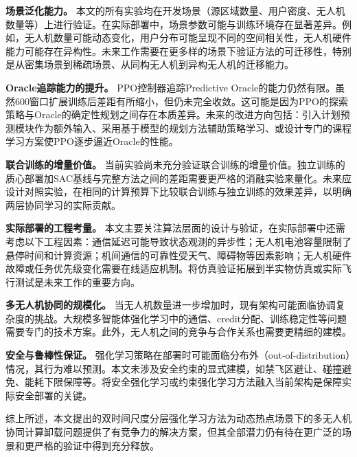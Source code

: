 \textbf{场景泛化能力。} 本文的所有实验均在开发场景（源区域数量、用户密度、无人机数量等）上进行验证。在实际部署中，场景参数可能与训练环境存在显著差异。例如，无人机数量可能动态变化，用户分布可能呈现不同的空间相关性，无人机硬件能力可能存在异构性。未来工作需要在更多样的场景下验证方法的可迁移性，特别是从密集场景到稀疏场景、从同构无人机到异构无人机的迁移能力。

\textbf{Oracle追踪能力的提升。} PPO控制器追踪Predictive Oracle的能力仍然有限。虽然600窗口扩展训练后差距有所缩小，但仍未完全收敛。这可能是因为PPO的探索策略与Oracle的确定性规划之间存在本质差异。未来的改进方向包括：引入计划预测模块作为额外输入、采用基于模型的规划方法辅助策略学习、或设计专门的课程学习方案使PPO逐步逼近Oracle的性能。

\textbf{联合训练的增量价值。} 当前实验尚未充分验证联合训练的增量价值。独立训练的质心部署加SAC基线与完整方法之间的差距需要更严格的消融实验来量化。未来应设计对照实验，在相同的计算预算下比较联合训练与独立训练的效果差异，以明确两层协同学习的实际贡献。

\textbf{实际部署的工程考量。} 本文主要关注算法层面的设计与验证，在实际部署中还需考虑以下工程因素：通信延迟可能导致状态观测的异步性；无人机电池容量限制了悬停时间和计算资源；机间通信的可靠性受天气、障碍物等因素影响；无人机硬件故障或任务优先级变化需要在线适应机制。将仿真验证拓展到半实物仿真或实际飞行测试是未来工作的重要方向。

\textbf{多无人机协同的规模化。} 当无人机数量进一步增加时，现有架构可能面临协调复杂度的挑战。大规模多智能体强化学习中的通信、credit分配、训练稳定性等问题需要专门的技术方案。此外，无人机之间的竞争与合作关系也需要更精细的建模。

\textbf{安全与鲁棒性保证。} 强化学习策略在部署时可能面临分布外（out-of-distribution）情况，其行为难以预测。本文未涉及安全约束的显式建模，如禁飞区避让、碰撞避免、能耗下限保障等。将安全强化学习或约束强化学习方法融入当前架构是保障实际安全部署的关键。

综上所述，本文提出的双时间尺度分层强化学习方法为动态热点场景下的多无人机协同计算卸载问题提供了有竞争力的解决方案，但其全部潜力仍有待在更广泛的场景和更严格的验证中得到充分释放。
